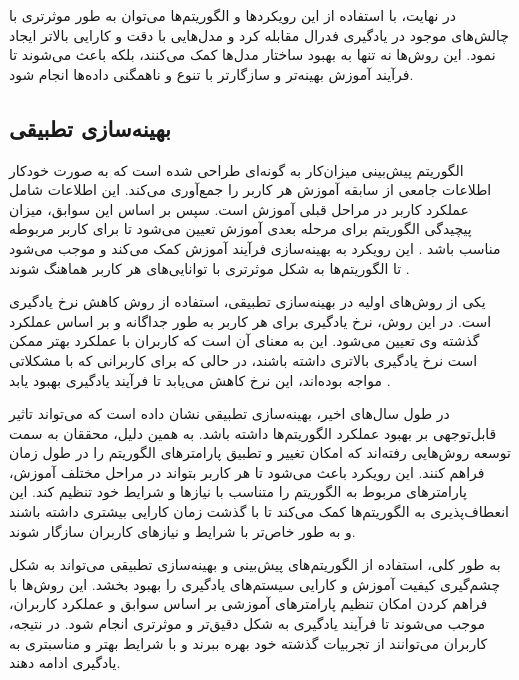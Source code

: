 در نهایت، با استفاده از این رویکردها و الگوریتم‌ها می‌توان به طور موثرتری با چالش‌های موجود در یادگیری فدرال مقابله کرد و مدل‌هایی با دقت و کارایی بالاتر ایجاد نمود. این روش‌ها نه تنها به بهبود ساختار مدل‌ها کمک می‌کنند، بلکه باعث می‌شوند تا فرآیند آموزش بهینه‌تر و سازگارتر با تنوع و ناهمگنی داده‌ها انجام شود.


\subsection{
	بهینه‌سازی تطبیقی%
}
الگوریتم پیش‌بینی میزان‌کار به گونه‌ای طراحی شده است که به صورت خودکار اطلاعات جامعی از سابقه آموزش هر کاربر را جمع‌آوری می‌کند. این اطلاعات شامل عملکرد کاربر در مراحل قبلی آموزش است. سپس بر اساس این سوابق، میزان پیچیدگی الگوریتم برای مرحله بعدی آموزش تعیین می‌شود تا برای کاربر مربوطه مناسب باشد . این رویکرد به بهینه‌سازی فرآیند آموزش کمک می‌کند و موجب می‌شود تا الگوریتم‌ها به شکل موثرتری با توانایی‌های هر کاربر هماهنگ شوند
\cite{li2021fedsae}.

یکی از روش‌های اولیه در بهینه‌سازی تطبیقی، استفاده از روش کاهش نرخ یادگیری است. در این روش، نرخ یادگیری برای هر کاربر به طور جداگانه و بر اساس عملکرد گذشته وی تعیین می‌شود. این به معنای آن است که کاربران با عملکرد بهتر ممکن است نرخ یادگیری بالاتری داشته باشند، در حالی که برای کاربرانی که با مشکلاتی مواجه بوده‌اند، این نرخ کاهش می‌یابد تا فرآیند یادگیری بهبود یابد
\cite{reddi2020adaptive}.

در طول سال‌های اخیر، بهینه‌سازی تطبیقی نشان داده است که می‌تواند تاثیر قابل‌توجهی بر بهبود عملکرد الگوریتم‌ها داشته باشد. به همین دلیل، محققان به سمت توسعه روش‌هایی رفته‌اند که امکان تغییر و تطبیق پارامترهای الگوریتم را در طول زمان فراهم کنند. این رویکرد باعث می‌شود تا هر کاربر بتواند در مراحل مختلف آموزش، پارامترهای مربوط به الگوریتم را متناسب با نیازها و شرایط خود تنظیم کند. این انعطاف‌پذیری به الگوریتم‌ها کمک می‌کند تا با گذشت زمان کارایی بیشتری داشته باشند و به طور خاص‌تر با شرایط و نیازهای کاربران سازگار شوند.

به طور کلی، استفاده از الگوریتم‌های پیش‌بینی و بهینه‌سازی تطبیقی می‌تواند به شکل چشم‌گیری کیفیت آموزش و کارایی سیستم‌های یادگیری را بهبود بخشد. این روش‌ها با فراهم کردن امکان تنظیم پارامترهای آموزشی بر اساس سوابق و عملکرد کاربران، موجب می‌شوند تا فرآیند یادگیری به شکل دقیق‌تر و موثرتری انجام شود. در نتیجه، کاربران می‌توانند از تجربیات گذشته خود بهره ببرند و با شرایط بهتر و مناسبتری به یادگیری ادامه دهند.


